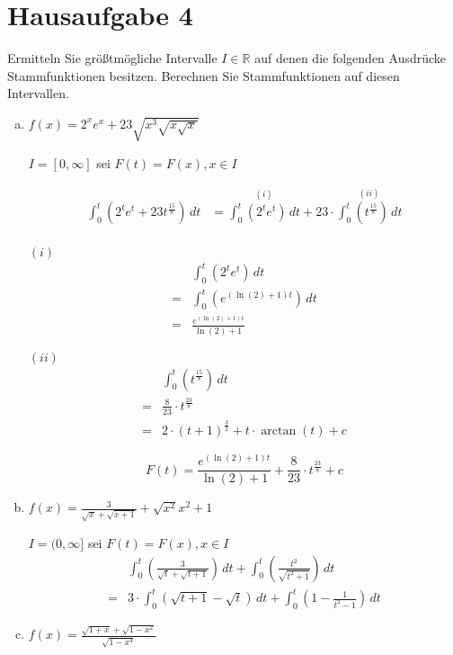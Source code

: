 \documentclass{article}
\begin{document}
\section*{Hausaufgabe 4}

Ermitteln Sie größtmögliche Intervalle $I \in \mathbb{R}$ auf denen
die folgenden Ausdrücke Stammfunktionen besitzen.
Berechnen Sie Stammfunktionen auf diesen Intervallen.

\begin{enumerate}[a)]
\item $f(x) = 2^xe^x + 23 \sqrt{x^3\sqrt{x\sqrt{x}}}$

  $I = [0, \infty]$ sei $F(t) = F(x), x \in I$

  \begin{align*}
    \int_0^t \left( 2^te^t + 23 t^{\frac{15}{8}} \right)\,dt &=
    \overset{(i)}{\int_0^t \left( 2^te^t \right) \,dt} + 23 \cdot \overset{(ii)}{\int_0^t \left(t^{\frac{15}{8}} \right) \,dt} \\
  \end{align*}
  \begin{minipage}[t]{.45\textwidth}
    \textbf{$(i)$}
    \begin{align*}
      &\int_0^t \left( 2^te^t \right) \,dt \\
      = & \int_0^t \left( e^{(\ln(2) + 1)t} \right) \,dt \\
      = & \frac{e^{(\ln(2) + 1)t}}{\ln(2) + 1}
    \end{align*}
  \end{minipage}
  \hfill
  \begin{minipage}[t]{.45\textwidth}
    \textbf{$(ii)$}
    \begin{align*}
      &\int_0^t \left( t^{\frac{15}{8}} \right) \,dt \\
      = & \frac{8}{23} \cdot t^{\frac{23}{8}} \\
      = & 2 \cdot (t + 1)^{\frac{3}{2}} + t \cdot \arctan (t) + c
    \end{align*}
  \end{minipage}
  \[
    F(t) = \frac{e^{(\ln(2) + 1)t}}{\ln(2) + 1} + \frac{8}{23} \cdot t^{\frac{23}{8}} + c
  \]

\item $f(x) = \frac{3}{\sqrt{x} + \sqrt{x + 1}} + \sqrt{x^2}{x^2 + 1}$

  $I = (0, \infty]$ sei $F(t) = F(x), x \in I$
  \begin{align*}
    &\int_0^t \left( \frac{3}{\sqrt{t} + \sqrt{t + 1}} \right)\,dt + \int_0^t \left( \frac{t^2}{\sqrt{t^2 + 1}} \right)\,dt \\
    = &3 \cdot \int_0^t \left( \sqrt{t + 1} - \sqrt{t} \right)\,dt + \int_0^t \left( 1 - \frac{1}{t^2 - 1} \right)\,dt
  \end{align*}
\item $f(x) = \frac{\sqrt{1 + x} + \sqrt{1 - x^2}}{\sqrt{1 - x^4}}$


\end{enumerate}
\end{document}
